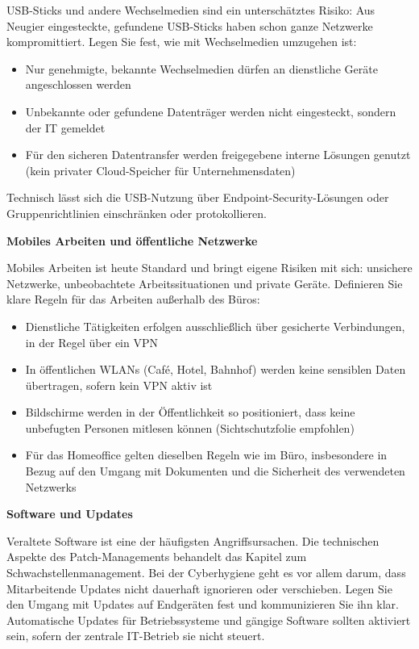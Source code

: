 USB-Sticks und andere Wechselmedien sind ein unterschätztes Risiko: Aus Neugier eingesteckte, gefundene USB-Sticks haben schon ganze Netzwerke kompromittiert. Legen Sie fest, wie mit Wechselmedien umzugehen ist:

\begin{itemize}
    \item Nur genehmigte, bekannte Wechselmedien dürfen an dienstliche Geräte angeschlossen werden
    \item Unbekannte oder gefundene Datenträger werden nicht eingesteckt, sondern der IT gemeldet
    \item Für den sicheren Datentransfer werden freigegebene interne Lösungen genutzt (kein privater Cloud-Speicher für Unternehmensdaten)
\end{itemize}

Technisch lässt sich die USB-Nutzung über Endpoint-Security-Lösungen oder Gruppenrichtlinien einschränken oder protokollieren.

\textbf{Mobiles Arbeiten und öffentliche Netzwerke}

Mobiles Arbeiten ist heute Standard und bringt eigene Risiken mit sich: unsichere Netzwerke, unbeobachtete Arbeitssituationen und private Geräte. Definieren Sie klare Regeln für das Arbeiten außerhalb des Büros:

\begin{itemize}
    \item Dienstliche Tätigkeiten erfolgen ausschließlich über gesicherte Verbindungen, in der Regel über ein VPN
    \item In öffentlichen WLANs (Café, Hotel, Bahnhof) werden keine sensiblen Daten übertragen, sofern kein VPN aktiv ist
    \item Bildschirme werden in der Öffentlichkeit so positioniert, dass keine unbefugten Personen mitlesen können (Sichtschutzfolie empfohlen)
    \item Für das Homeoffice gelten dieselben Regeln wie im Büro, insbesondere in Bezug auf den Umgang mit Dokumenten und die Sicherheit des verwendeten Netzwerks
\end{itemize}
\newpage
\textbf{Software und Updates}

Veraltete Software ist eine der häufigsten Angriffsursachen. Die technischen Aspekte des Patch-Managements behandelt das Kapitel zum Schwachstellenmanagement. Bei der Cyberhygiene geht es vor allem darum, dass Mitarbeitende Updates nicht dauerhaft ignorieren oder verschieben. Legen Sie den Umgang mit Updates auf Endgeräten fest und kommunizieren Sie ihn klar. Automatische Updates für Betriebssysteme und gängige Software sollten aktiviert sein, sofern der zentrale IT-Betrieb sie nicht steuert.

